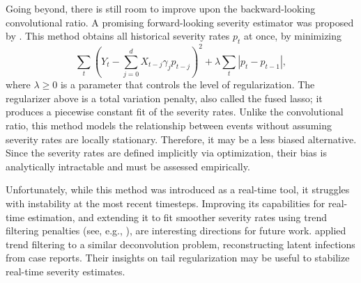 \documentclass{article}
\begin{document}
Going beyond, there is still room to improve upon the backward-looking
convolutional ratio. 
A promising forward-looking severity estimator was proposed by \citet{fusedlasso}. 
This method obtains all historical severity rates $p_t$ at once, by minimizing  
\[
\sum_t (Y_t - \sum_{j=0}^d X_{t-j}\gamma_j p_{t-j})^2 + 
\lambda \sum_t |p_t - p_{t-1}|,
\]
\noindent where $\lambda \geq 0$ is a parameter that controls the level of
regularization. The regularizer above is a total variation penalty, also called the fused lasso; it produces a piecewise constant fit of the severity rates.
Unlike the convolutional ratio, this method models the relationship between events without assuming severity rates are locally stationary. 
Therefore, it may be a less biased alternative.
Since the severity rates are defined implicitly via optimization, their bias is analytically intractable and must be assessed empirically.

Unfortunately, while this method was introduced as a real-time tool, it struggles with instability at the most recent timesteps.
Improving its capabilities for real-time estimation, 
and extending it to fit smoother severity rates using
trend filtering penalties (see, e.g., \citealp{Tibshirani2014}), are interesting
directions for future work. \citet{Jahja2022} applied trend filtering to a
similar deconvolution problem, reconstructing latent infections from case
reports. Their insights on tail regularization may be useful to stabilize
real-time severity estimates.


\end{document}
